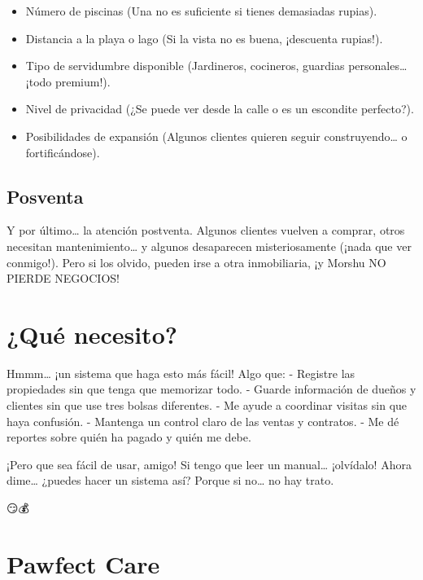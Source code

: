 \documentclass[
  letterpaper,
  DIV=11,
  numbers=noendperiod]{scrreprt}
\providecommand{\tightlist}{%
  \setlength{\itemsep}{0pt}\setlength{\parskip}{0pt}}\usepackage{longtable,booktabs,array}
\begin{document}
\begin{itemize}
\tightlist
\item
  Número de piscinas (Una no es suficiente si tienes demasiadas rupias).
\item
  Distancia a la playa o lago (Si la vista no es buena, ¡descuenta
  rupias!).
\item
  Tipo de servidumbre disponible (Jardineros, cocineros, guardias
  personales\ldots{} ¡todo premium!).
\item
  Nivel de privacidad (¿Se puede ver desde la calle o es un escondite
  perfecto?).
\item
  Posibilidades de expansión (Algunos clientes quieren seguir
  construyendo\ldots{} o fortificándose).
\end{itemize}

\section{Posventa}\label{posventa}

Y por último\ldots{} la atención postventa. Algunos clientes vuelven a
comprar, otros necesitan mantenimiento\ldots{} y algunos desaparecen
misteriosamente (¡nada que ver conmigo!). Pero si los olvido, pueden
irse a otra inmobiliaria, ¡y Morshu NO PIERDE NEGOCIOS!


\chapter{¿Qué necesito?}\label{quuxe9-necesito}

Hmmm\ldots{} ¡un sistema que haga esto más fácil! Algo que: - Registre
las propiedades sin que tenga que memorizar todo. - Guarde información
de dueños y clientes sin que use tres bolsas diferentes. - Me ayude a
coordinar visitas sin que haya confusión. - Mantenga un control claro de
las ventas y contratos. - Me dé reportes sobre quién ha pagado y quién
me debe.

¡Pero que sea fácil de usar, amigo! Si tengo que leer un manual\ldots{}
¡olvídalo! Ahora dime\ldots{} ¿puedes hacer un sistema así? Porque si
no\ldots{} no hay trato.

😏💰


\chapter{Pawfect Care}\label{pawfect-care}
\end{document}
